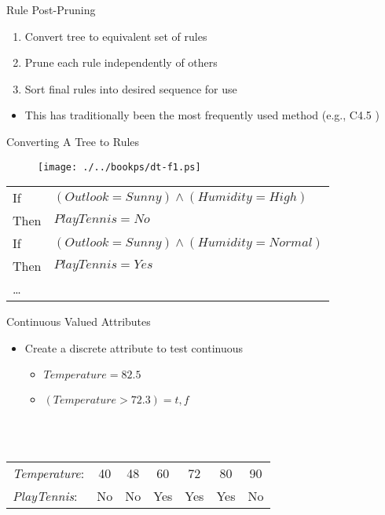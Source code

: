 \documentclass[%
pdf,
colorBG,
slideColor,
tcrico,
]{prosper}
\begin{document}
\begin{slide}{Rule Post-Pruning } 
\begin{enumerate}
\item Convert tree to equivalent set of rules
\item Prune each rule independently of others
\item Sort final rules into desired sequence for use
\end{enumerate}
\begin{itemize}
\item This has traditionally been the most frequently used method (e.g., C4.5 )
\end{itemize}
\end{slide}


\begin{slide}{Converting A Tree to Rules } 
\begin{figure}
	\centering
	\texttt{[image: ./../bookps/dt-f1.ps]}
\end{figure}
\small
\begin{tabular}{ll}
   If & $(Outlook=Sunny) \wedge (Humidity=High)$ \\
   Then & $PlayTennis=No$ \\
   If & $(Outlook=Sunny) \wedge (Humidity=Normal)$ \\
   Then & $PlayTennis=Yes$ \\
   \ldots &  \\
\end{tabular}
\end{slide}




\begin{slide}{Continuous Valued Attributes } 
\begin{itemize}
\item Create a discrete attribute to test continuous
	\begin{itemize}
	\item $Temperature = 82.5$
	\item $(Temperature>72.3) = t,f$
	\end{itemize}
\end{itemize}
\begin{center}
\ \\
\ \\
\begin{tabular}{lcccccc} \hline
  \rowcolor[HTML]{bbccdd} {\em Temperature}: &40 &48 &60 &72 &80 &90 \\
  \rowcolor[HTML]{ccddee} {\em PlayTennis}:&No &No&Yes&Yes&Yes &No \\ \hline
\end{tabular}
\end{center}
\end{slide}
\end{document}
